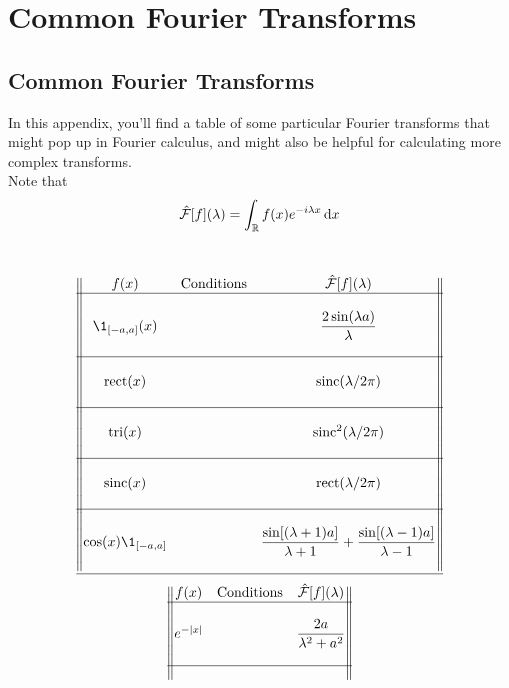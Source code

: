 \documentclass[../complete.tex]{subfiles}
\begin{document}
\chapter{Common Fourier Transforms}
\section{Common Fourier Transforms}
In this appendix, you'll find a table of some particular Fourier transforms that might pop up in Fourier calculus, and might also be helpful for calculating more complex transforms.\\
Note that
\begin{equation}
	\hat{\mathcal{F}}[f](\lambda)=\int_{\mathbb{R}} f(x)e^{-i\lambda x}\operatorname{d\!} x
\end{equation}
\\
\begin{center}
\begin{equation*}
	\begin{Vmatrix}
		f(x) &\text{Conditions}& \fou[f](\lambda) \\
		\hline\\
		\1_{[-a,a]}(x) && \dfrac{2\sin(\lambda a)}{\lambda} \\
		\\\hline\\
		 \mathrm{rect}(x) && \mathrm{sinc}(\lambda/2\pi) \\
		\\\hline\\
		 \mathrm{tri}(x) && \mathrm{sinc}^2(\lambda/2\pi) \\
		\\\hline\\
		 \mathrm{sinc}(x) && \mathrm{rect}(\lambda/2\pi) \\
		\\\hline\\
		\cos(x)\1_{[-a,a]} && \dfrac{\sin[(\lambda+1)a]}{\lambda+1}+\dfrac{\sin[(\lambda-1)a]}{\lambda-1} \\
		\\\hline
	\end{Vmatrix}
\end{equation*}
\begin{equation*}
	\begin{Vmatrix}
		f(x) & \text{Conditions} & \hat{\mathcal{F}}[f](\lambda) \\
		\hline\\
		e^{-\abs{x}} & & \dfrac{2a}{\lambda^2+a^2} \\
		\\\hline\\

\end{Vmatrix}
\end{equation*}
\end{center}
\end{document}
